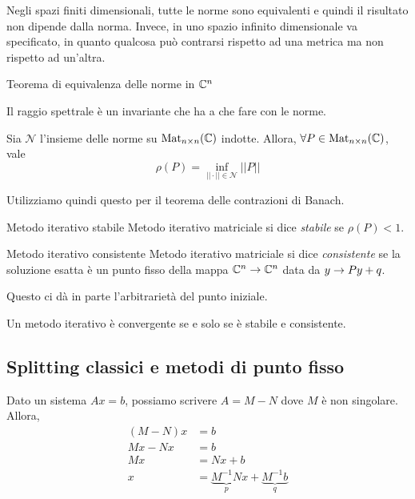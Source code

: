 \documentclass[a4paper]{article}
\begin{document}
Negli spazi finiti dimensionali, tutte le norme sono equivalenti
e quindi il risultato non dipende dalla norma.
Invece, in uno spazio infinito dimensionale va specificato,
in quanto qualcosa può contrarsi rispetto ad una metrica ma non rispetto ad un'altra.

\begin{snippettheorem}{Teorema di equivalenza delle norme in \(\mathbb{C}^n\)}
    \todo
\end{snippettheorem}

Il raggio spettrale è un invariante che ha a che fare con le norme.

\begin{snippettheorem}{}
    Sia \(\mathcal N\) l'insieme delle norme su \(\operatorname{Mat}_{n \times n}(\mathbb{C})\)
    indotte. Allora, \(\forall P \in \operatorname{Mat}_{n \times n}(\mathbb{C})\), vale
    \[
        \rho(P) = \inf_{||\cdot|| \in \mathcal N} ||P||
    \]
\end{snippettheorem}

Utilizziamo quindi questo per il teorema delle contrazioni di Banach.

\begin{snippetdefinition}{Metodo iterativo stabile}
    Metodo iterativo matriciale si dice \emph{stabile}
    se \(\rho(P) < 1\).
\end{snippetdefinition}

\begin{snippetdefinition}{Metodo iterativo consistente}
    Metodo iterativo matriciale si dice \emph{consistente}
    se la soluzione esatta è un punto fisso della mappa
    \(\mathbb{C}^n \to \mathbb{C}^n\)
    data da \(y \to Py+q\).
\end{snippetdefinition}

Questo ci dà in parte l'arbitrarietà del punto iniziale.

\begin{snippettheorem}{}
    Un metodo iterativo è convergente se e solo se è stabile e consistente.
\end{snippettheorem}

\subsection{Splitting classici e metodi di punto fisso}

Dato un sistema \(Ax = b\), possiamo scrivere
\(A = M-N\) dove \(M\) è non singolare.
Allora,
\begin{align*}
    (M-N)x &= b \\
    Mx - Nx &= b \\
    Mx &= Nx + b \\
    x &= \underbrace{M^{-1}N}_{p}x + \underbrace{M^{-1}b}_{q}
\end{align*}
\end{document}

